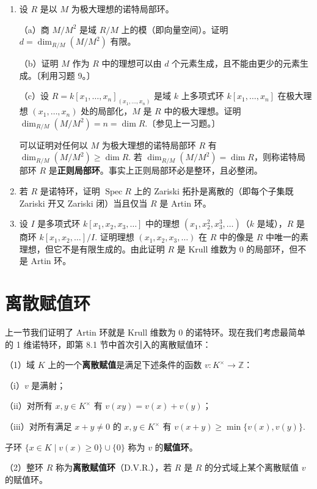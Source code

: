\begin{enumerate}
（a）证明 \(d_t(R_1) = d_t(R) = m\) 且 \(d_P(R_1) = d_P(R)\). 由此我们可以假设 \(R = R_1\).〔用上升与下降定理（参见第 15.3 节定理 26）证明第二个等式。〕

（b）当 \(R = R_1\) 时，通过给出显式的长度为 \(m\) 的素理想链证明 \(d_P(R) \geq d_t(R)\).

（c）当 \(R = R_1\) 时，证明 \(R\) 的任何非零素理想都含有元素 \(f\) 使 \(R_{(f)}\) 在 \(R\) 上超越且超越次数为 1. 用归纳法证明 \(d_P(R) \leq d_t(R)\)，并由此 \(d_P(R) = d_t(R)\).

\item 设 \(R\) 是以 \(M\) 为极大理想的诺特局部环。

（a）商 \(M/M^2\) 是域 \(R/M\) 上的模（即向量空间）。证明 \(d = \dim_{R/M}(M/M^2)\) 有限。

（b）证明 \(M\) 作为 \(R\) 中的理想可以由 \(d\) 个元素生成，且不能由更少的元素生成。〔利用习题 9。〕

（c）设 \(R = k[x_1, \ldots, x_n]_{(x_1, \ldots, x_n)}\) 是域 \(k\) 上多项式环 \(k[x_1, \ldots, x_n]\) 在极大理想 \((x_1, \ldots, x_n)\) 处的局部化，\(M\) 是 \(R\) 中的极大理想。证明 \(\dim_{R/M}(M/M^2) = n = \dim R\).〔参见上一习题。〕

\noindent 可以证明对任何以 \(M\) 为极大理想的诺特局部环 \(R\) 有 \(\dim_{R/M}(M/M^2) \geq \dim R\). 若 \(\dim_{R/M}(M/M^2) = \dim R\)，则称诺特局部环 \(R\) 是\textbf{正则局部环}。事实上正则局部环必是整环，且必整闭。

\item 若 \(R\) 是诺特环，证明 \(\operatorname{Spec}R\) 上的 Zariski 拓扑是离散的（即每个子集既 Zariski 开又 Zariski 闭）当且仅当 \(R\) 是 Artin 环。

\item 设 \(I\) 是多项式环 \(k[x_1, x_2, x_3, \ldots]\) 中的理想 \((x_1, x_2^2, x_3^3, \ldots)\)（\(k\) 是域），\(R\) 是商环 \(k[x_1, x_2, \ldots]/I\). 证明理想 \((x_1, x_2, x_3, \ldots)\) 在 \(R\) 中的像是 \(R\) 中唯一的素理想，但它不是有限生成的。由此证明 \(R\) 是 Krull 维数为 0 的局部环，但不是 Artin 环。
\end{enumerate}

\section{离散赋值环}

上一节我们证明了 Artin 环就是 Krull 维数为 0 的诺特环。现在我们考虑最简单的 1 维诺特环，即第 8.1 节中首次引入的离散赋值环：

\begin{definition}
（1）域 \(K\) 上的一个\textbf{离散赋值}是满足下述条件的函数 \(v : K^\times \to \mathbb{Z}\)：

（i）\(v\) 是满射；

（ii）对所有 \(x, y \in K^\times\) 有 \(v(xy) = v(x)+v(y)\)；

（iii）对所有满足 \(x+y \neq 0\) 的 \(x, y \in K^\times\) 有 \(v(x+y) \geq \min\{v(x), v(y)\}\).

子环 \(\{x \in K \mid v(x) \geq 0\} \cup \{0\}\) 称为 \(v\) 的\textbf{赋值环}。

（2）整环 \(R\) 称为\textbf{离散赋值环}（D.V.R.），若 \(R\) 是 \(R\) 的分式域上某个离散赋值 \(v\) 的赋值环。
\end{definition}

